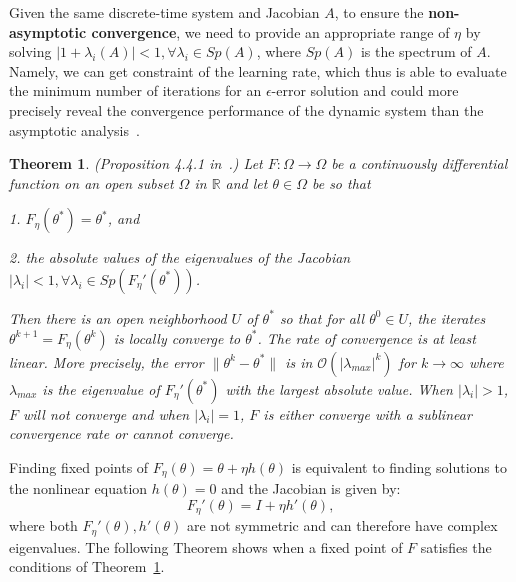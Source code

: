 \documentclass{article} \usepackage{iclr2023_conference,times}
\newtheorem{theo}{Theorem}
\begin{document}
Given the same discrete-time system and Jacobian $A$, to ensure the \textbf{non-asymptotic convergence}, we need to provide an appropriate range of $\eta$ by solving $|1+\lambda_i(A)|<1,\forall \lambda_i\in Sp(A)$, where $Sp(A)$ is the spectrum of $A$. Namely, we can get constraint of the learning rate, which thus is able to evaluate the minimum number of iterations for an $\epsilon$-error solution and could more precisely reveal the convergence performance of the dynamic system than the asymptotic analysis~\citep{nie2020towards}. 

\begin{theo}
(Proposition 4.4.1 in~\citep{nonlinear2002dim}.) Let $F:\Omega\rightarrow\Omega$ be a continuously differential function on an open subset $\Omega$ in $\mathbb{R}$ and let $\theta\in\Omega$ be so that 

1. $F_\eta(\theta^*)=\theta^*$, and 

2. the absolute values of the eigenvalues of the Jacobian $|\lambda_i|<1,\forall \lambda_i\in Sp(F_\eta'(\theta^*))$. 

Then there is an open neighborhood $U$ of $\theta^*$ so that for all $\theta^0\in U$, the iterates $\theta^{k+1}=F_\eta(\theta^k)$ is locally converge to $\theta^*$. The rate of convergence is at least linear. More precisely, the error $\parallel \theta^{k}-\theta^*\parallel$ is in $\mathcal{O}(|\lambda_{max}|^k)$ for $k\rightarrow\infty$ where $\lambda_{max}$ is the eigenvalue of $F_\eta'(\theta^*)$ with the largest absolute value. When $|\lambda_i|>1$, $F$ will not converge and when $|\lambda_i|=1$, $F$ is either converge with a sublinear convergence rate or cannot converge.
\label{theo:convergence}
\end{theo}

Finding fixed points of $F_\eta(\theta)=\theta+\eta h(\theta)$ is equivalent to finding solutions to the nonlinear equation $h(\theta)=0$ and the Jacobian is given by:
\begin{equation}
  F_\eta'(\theta)=I+\eta h'(\theta),  
\end{equation}
where both $F_\eta'(\theta),h'(\theta)$ are not symmetric and can therefore have complex eigenvalues. The following Theorem shows when a fixed point of $F$ satisfies the conditions of Theorem~\ref{theo:convergence}.
\end{document}
